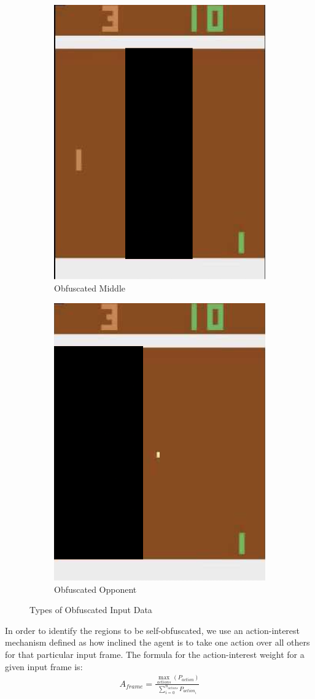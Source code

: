 \documentclass{article}
\begin{document}
\begin{figure}
  \centering
  \begin{subfigure}{.5\textwidth}
    \centering
    \includegraphics[width=.4\linewidth]{obfuscated_middle.png}
    \caption{Obfuscated Middle}
    \label{fig:sub1}
  \end{subfigure}%
  \begin{subfigure}{.5\textwidth}
    \centering
    \includegraphics[width=.4\linewidth]{obfuscated_op.png}
    \caption{Obfuscated Opponent}
    \label{fig:sub2}
  \end{subfigure}
  \caption{Types of Obfuscated Input Data}
  \label{fig:obfuscated}
\end{figure}


In order to identify the regions to be self-obfuscated, we use an action-interest mechanism defined as how inclined the agent is to take one action over all
others for that particular input frame. The formula for the action-interest weight for a given input frame is:
\begin{gather*}
  A_{frame} = \frac{\max_{actions}(P_{action})}{\sum\limits_{i=0}^{n_{actions}}P_{action_i}}
\end{gather*}
\end{document}
